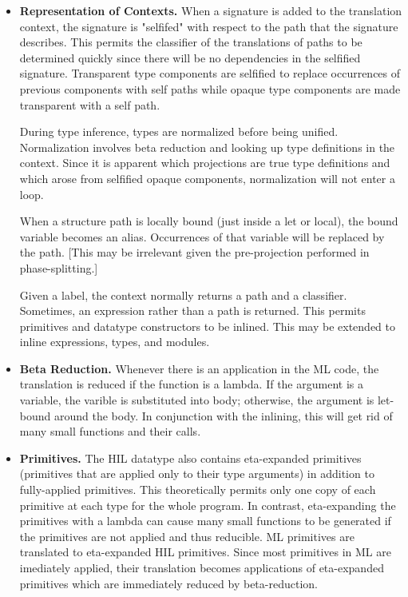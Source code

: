 \documentclass[twoside]{article}
\begin{document}
\begin{itemize}
\item \textbf{Representation of Contexts. }
When a signature is added to the translation context, the signature is
"selfifed" with respect to the path that the signature describes.
This permits the classifier of the translations of paths to be
determined quickly since there will be no dependencies in the
selfified signature.  Transparent type components are selfified to
replace occurrences of previous components with self paths while
opaque type components are made transparent with a self path.

During type inference, types are normalized before being unified.
Normalization involves beta reduction and looking up type definitions
in the context.  Since it is apparent which projections are true 
type definitions and which arose from selfified opaque components,
normalization will not enter a loop.

When a structure path is locally bound (just inside a let or local),
the bound variable becomes an alias.  Occurrences of that variable will
be replaced by the path.  [This may be irrelevant given the pre-projection
performed in phase-splitting.]

Given a label, the context normally returns a path and a classifier.
Sometimes, an expression rather than a path is returned.  This permits
primitives and datatype constructors to be inlined.  This may be extended
to inline expressions, types, and modules.

\item \textbf{Beta Reduction. }
Whenever there is an application in the ML code, the translation is
reduced if the function is a lambda.  If the argument is a variable,
the varible is substituted into body; otherwise, the argument is
let-bound around the body.  In conjunction with the inlining, this
will get rid of many small functions and their calls.

\item \textbf{Primitives. }
The HIL datatype also contains eta-expanded primitives (primitives
that are applied only to their type arguments) in addition to
fully-applied primitives.  This theoretically permits only one copy of
each primitive at each type for the whole program.  In contrast,
eta-expanding the primitives with a lambda can cause many small functions
to be generated if the primitives are not applied and thus reducible.
ML primitives are translated to eta-expanded HIL primitives.
Since most primitives in ML are imediately applied,
their translation becomes applications of eta-expanded primitives 
which are immediately reduced by beta-reduction.


\end{itemize}
\end{document}
